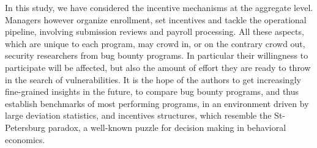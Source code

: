 In this study, we have considered the incentive mechanisms at the aggregate level. Managers however organize enrollment, set incentives and tackle the operational pipeline, involving submission reviews and payroll processing. All these aspects, which are unique to each program, may crowd in, or on the contrary crowd out, security researchers from bug bounty programs. In particular their willingness to participate will be affected, but also the amount of effort they are ready to throw in the search of vulnerabilities. It is the hope of the authors to get increasingly fine-grained insights in the future, to compare bug bounty programs, and thus establish benchmarks of most performing programs, in an environment driven by large deviation statistics, and incentives structures, which resemble the St-Petersburg paradox, a well-known puzzle for decision making in behavioral economics.
